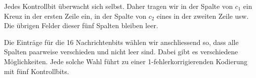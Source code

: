 \begin{center}
\end{center}

Jedes Kontrollbit überwacht sich selbst. Daher tragen wir
in der Spalte von \(c_1\) ein Kreuz in der ersten Zeile ein,
in der Spalte von \(c_2\) eines in der zweiten Zeile usw.
Die übrigen Felder dieser fünf Spalten bleiben leer.

Die Einträge für die 16 Nachrichtenbits wählen wir
anschliessend so, dass alle Spalten paarweise verschieden
und nicht leer sind. Dabei gibt es verschiedene Möglichkeiten.
Jede solche Wahl führt zu einer 1-fehlerkorrigierenden
Kodierung mit fünf Kontrollbits.


